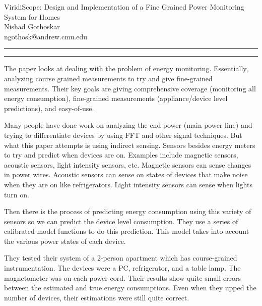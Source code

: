 \documentclass[11pt]{article}
\newcommand{\question}[2] {\vspace{.25in} \hrule\vspace{0.5em}
	\noindent{\bf #1: #2} \vspace{0.5em}
	\hrule \vspace{.10in}}
\newcommand{\myname}{Nishad Gothoskar}
\newcommand{\myandrew}{ngothosk}
\begin{document}
	
	\medskip                        %
	
	\thispagestyle{plain}
	\begin{center}                  %
		{\Large ViridiScope: Design and Implementation of a Fine Grained Power Monitoring System for Homes
} \\
		\myname \\
		\myandrew @andrew.cmu.edu\\
	\end{center}
	
	\question{1}{Summary}
	\quad The paper looks at dealing with the problem of energy monitoring. Essentially, analyzing course grained measurements to try and give fine-grained measurements. Their key goals are giving comprehensive coverage (monitoring all energy consumption),  fine-grained measurements (appliance/device level predictions), and easy-of-use.
	
	\quad Many people have done work on analyzing the end power (main power line) and trying to differentiate devices by using FFT and other signal techniques. But what this paper attempts is using indirect sensing. Sensors besides energy meters to try and predict when devices are on. Examples include magnetic sensors, acoustic sensors, light intensity sensors, etc. Magnetic sensors can sense changes in power wires. Acoustic sensors can sense on states of devices that make noise when they are on like refrigerators. Light intensity sensors can sense when lights turn on.
	
	\quad Then there is the process of predicting energy consumption using this variety of sensors so we can predict the device level consumption. They use a series of calibrated model functions to do this prediction. This model takes into account the various power states of each device.
	
	\quad They tested their system of a 2-person apartment which has course-grained instrumentation. The devices were a PC, refrigerator, and a table lamp. The magnetometer was on each power cord. Their results show quite small errors between the estimated and true energy consumptions. Even when they upped the number of devices, their estimations were still quite correct.
	
\end{document}
